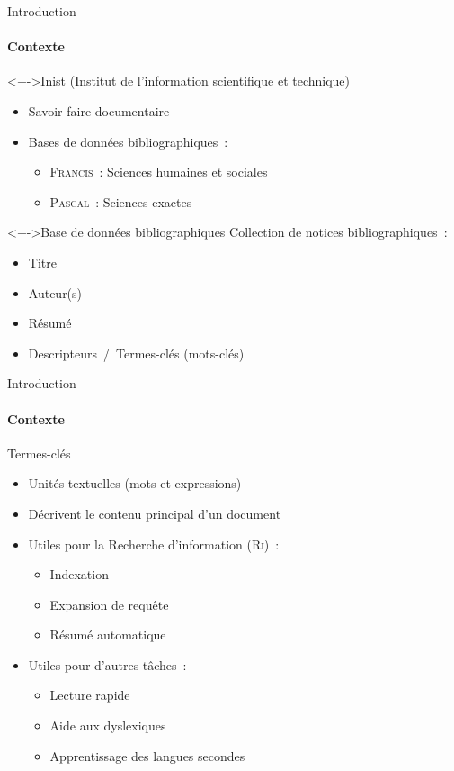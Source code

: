 \begin{frame}{Introduction}\framesubtitle{Contexte}

  \begin{block}<+->{Inist (Institut de l'information scientifique et technique)}
    \begin{itemize}
      \item{Savoir faire documentaire}
      \item{Bases de données bibliographiques~:}
      \begin{itemize}
        \item{\textsc{Francis}~: Sciences humaines et sociales}
        \item{\textsc{Pascal}~: Sciences exactes}
      \end{itemize}
    \end{itemize}
  \end{block}

  \begin{block}<+->{Base de données bibliographiques}
    Collection de notices bibliographiques~:
    \begin{itemize}
      \item{Titre}
      \item{Auteur(s)}
      \item{Résumé}
      \item{Descripteurs~/~Termes-clés (mots-clés)}
    \end{itemize}
  \end{block}
\end{frame}

\begin{frame}{Introduction}\framesubtitle{Contexte}
  \begin{block}{Termes-clés}
    \begin{itemize}
      \item<1->{Unités textuelles (mots et expressions)}
      \item<1->{Décrivent le contenu principal d'un document}
      \item<2->{Utiles pour la Recherche d'information (\textsc{Ri})~:}
      \begin{itemize}
        \item{Indexation}
        \item{Expansion de requête}
        \item{Résumé automatique}
      \end{itemize}
      \item<3->{Utiles pour d'autres tâches~:}
      \begin{itemize}
        \item{Lecture rapide}
        \item{Aide aux dyslexiques}
        \item{Apprentissage des langues secondes}
      \end{itemize}
    \end{itemize}
  \end{block}
\end{frame}

